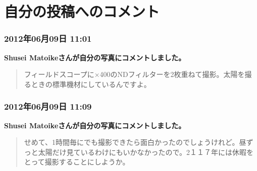 \documentclass[facebook_diary.tex]{subfiles}
\begin{document}
\chapter{自分の投稿へのコメント}

\subsection*{2012年06月09日 11:01}

\textbf{Shusei Matoikeさんが自分の写真にコメントしました。}

\begin{quote}
フィールドスコープに×400のNDフィルターを2枚重ねて撮影。太陽を撮るときの標準機材にしているんですよ。

\end{quote}

\subsection*{2012年06月09日 11:09}

\textbf{Shusei Matoikeさんが自分の写真にコメントしました。}

\begin{quote}
せめて、1時間毎にでも撮影できたら面白かったのでしょうけれど。昼ずっと太陽だけ見ているわけにもいかなかったので。2１１７年には休暇をとって撮影することにしようか。

\end{quote}
\end{document}
